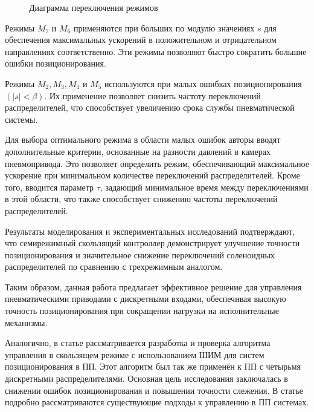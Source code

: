 \begin{figure}[ht]
{
    }
    \caption{Диаграмма переключения режимов }\label{fig:actuators_scheme}
\end{figure}

Режимы $M_7$ и $M_6$ применяются при больших по модулю значениях $s$ для обеспечения максимальных ускорений в положительном и
отрицательном направлениях соответственно. Эти режимы позволяют быстро сократить большие ошибки позиционирования.

Режимы $M_2, M_3, M_4$ и $M_5$ используются при малых ошибках позиционирования $(\lvert s \rvert < \beta)$. Их применение позволяет снизить частоту
переключений распределителей, что способствует увеличению срока службы пневматической системы.

Для выбора оптимального режима в области малых ошибок авторы вводят дополнительные критерии, основанные на разности давлений
в камерах пневмопривода. Это позволяет определить режим, обеспечивающий максимальное ускорение при минимальном количестве
переключений
распределителей. Кроме того, вводится параметр $\tau$, задающий минимальное время между переключениями в этой области, что также
способствует снижению частоты переключений распределителей.

Результаты моделирования и экспериментальных исследований подтверждают,
что семирежимный скользящий контроллер демонстрирует улучшение точности позиционирования и значительное снижение переключений соленоидных
распределителей по сравнению с трехрежимным аналогом.

Таким образом, данная работа предлагает эффективное решение для управления пневматическими приводами с дискретными входами, обеспечивая
высокую точность позиционирования при сокращении нагрузки на исполнительные механизмы.


Аналогично, в статье \cite*{Zhonglin} рассматривается разработка и проверка алгоритма управления в скользящем режиме с
использованием ШИМ для систем позиционирования в ПП. Этот алгоритм был так же применён к ПП с четырьмя дискретными распределителями.
Основная цель исследования заключалась в снижении ошибок позиционирования и повышении точности слежения. В статье подробно рассматриваются существующие подходы к управлению в ПП системах.

